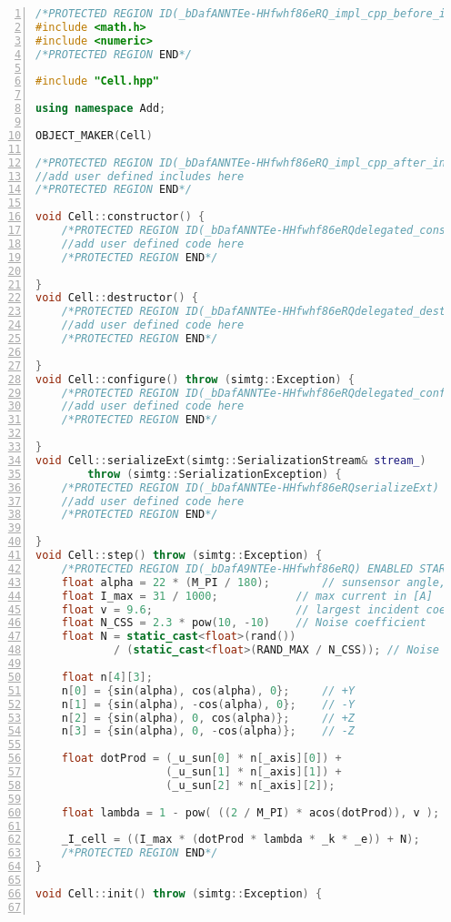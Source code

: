 \begin{appendices}
\begin{lstlisting}[frame=single,
numbers=left, basicstyle=\tiny, language = C++]
/*PROTECTED REGION ID(_bDafANNTEe-HHfwhf86eRQ_impl_cpp_before_includeimplementation) ENABLED START*/
#include <math.h>
#include <numeric>
/*PROTECTED REGION END*/

#include "Cell.hpp"

using namespace Add;

OBJECT_MAKER(Cell)

/*PROTECTED REGION ID(_bDafANNTEe-HHfwhf86eRQ_impl_cpp_after_includeimplementation) ENABLED START*/
//add user defined includes here
/*PROTECTED REGION END*/

void Cell::constructor() {
	/*PROTECTED REGION ID(_bDafANNTEe-HHfwhf86eRQdelegated_constructor) ENABLED START*/
	//add user defined code here
	/*PROTECTED REGION END*/

}
void Cell::destructor() {
	/*PROTECTED REGION ID(_bDafANNTEe-HHfwhf86eRQdelegated_destructor) ENABLED START*/
	//add user defined code here
	/*PROTECTED REGION END*/

}
void Cell::configure() throw (simtg::Exception) {
	/*PROTECTED REGION ID(_bDafANNTEe-HHfwhf86eRQdelegated_configure) ENABLED START*/
	//add user defined code here
	/*PROTECTED REGION END*/

}
void Cell::serializeExt(simtg::SerializationStream& stream_)
		throw (simtg::SerializationException) {
	/*PROTECTED REGION ID(_bDafANNTEe-HHfwhf86eRQserializeExt) ENABLED START*/
	//add user defined code here
	/*PROTECTED REGION END*/

}
void Cell::step() throw (simtg::Exception) {
	/*PROTECTED REGION ID(_bDafA9NTEe-HHfwhf86eRQ) ENABLED START*/
	float alpha = 22 * (M_PI / 180);		// sunsensor angle, converted to rad
	float I_max = 31 / 1000;			// max current in [A]
	float v = 9.6;						// largest incident coeff [-]
	float N_CSS = 2.3 * pow(10, -10)	// Noise coefficient
	float N = static_cast<float>(rand())
			/ (static_cast<float>(RAND_MAX / N_CSS)); // Noise

	float n[4][3];
	n[0] = {sin(alpha), cos(alpha), 0};		// +Y
	n[1] = {sin(alpha), -cos(alpha), 0};	// -Y
	n[2] = {sin(alpha), 0, cos(alpha)};		// +Z
	n[3] = {sin(alpha), 0, -cos(alpha)};	// -Z

	float dotProd = (_u_sun[0] * n[_axis][0]) +
					(_u_sun[1] * n[_axis][1]) +
					(_u_sun[2] * n[_axis][2]);

	float lambda = 1 - pow( ((2 / M_PI) * acos(dotProd)), v );

	_I_cell = ((I_max * (dotProd * lambda * _k * _e)) + N);
	/*PROTECTED REGION END*/
}

void Cell::init() throw (simtg::Exception) {


\end{lstlisting}
\end{appendices}

